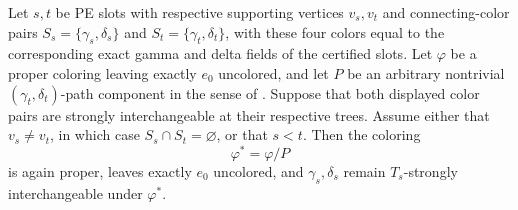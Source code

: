 \begin{lemma}
Let \(s,t\) be PE slots with respective supporting vertices
\(v_s,v_t\) and connecting-color pairs
\(S_s=\{\gamma_s,\delta_s\}\) and
\(S_t=\{\gamma_t,\delta_t\}\), with these four colors equal to the
corresponding exact gamma and delta fields of the certified slots.  Let
\(\varphi\) be a proper coloring
leaving exactly \(e_0\) uncolored, and let \(P\) be an arbitrary
nontrivial \((\gamma_t,\delta_t)\)-path component in the sense of
.  Suppose that both displayed
color pairs are strongly interchangeable at their respective trees.
Assume either that \(v_s\ne v_t\), in which case
\(S_s\cap S_t=\varnothing\), or that \(s<t\).  Then the coloring
\[
       \varphi^*=\varphi/P
\]
is again proper, leaves exactly \(e_0\) uncolored, and
\(\gamma_s,\delta_s\) remain \(T_s\)-strongly interchangeable under
\(\varphi^*\).
\end{lemma}
